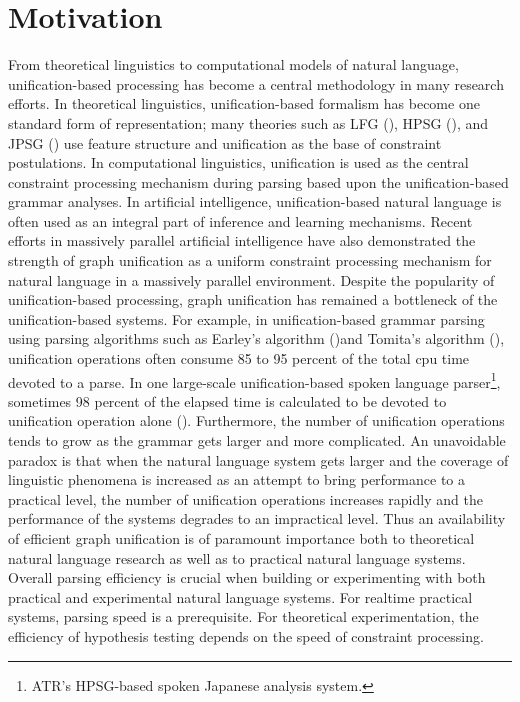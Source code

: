 
 



\maketitle



\section{Motivation}

 From theoretical linguistics to computational models of natural
language, unification-based processing has become a central
methodology in many research efforts. In theoretical linguistics,
unification-based formalism has become one standard form of
representation; many theories such as LFG (\cite{LFG}), HPSG
(\cite{HPSG}), and JPSG (\cite{JPSG}) use feature structure and
unification as the base of constraint postulations.  In computational
linguistics, unification is used as the central constraint processing
mechanism during parsing based upon the unification-based grammar
analyses. In artificial intelligence, unification-based natural
language is often used as an integral part of inference and learning
mechanisms. Recent efforts in massively parallel artificial
intelligence have also demonstrated the strength of graph unification
as a uniform constraint processing mechanism for natural language in a
massively parallel environment.  Despite the popularity of
unification-based processing, graph unification has remained a
bottleneck of the unification-based systems.  For example, in
unification-based grammar parsing using parsing algorithms such as
Earley's algorithm (\cite{Earley})and Tomita's algorithm
(\cite{Tomita}), unification operations often consume 85 to 95 percent
of the total cpu time devoted to a parse. In one large-scale
unification-based spoken language parser\footnote{ATR's HPSG-based
spoken Japanese analysis system.}, sometimes 98 percent of the elapsed
time is calculated to be devoted to unification operation alone
(\cite{Kogure-Lazy}).  Furthermore, the number of unification
operations tends to grow as the grammar gets larger and more
complicated.  An unavoidable paradox is that when the natural language
system gets larger and the coverage of linguistic phenomena is
increased as an attempt to bring performance to a practical level, the
number of unification operations increases rapidly and the performance
of the systems degrades to an impractical level. Thus an availability
of efficient graph unification is of paramount importance both to
theoretical natural language research as well as to practical natural
language systems.  Overall parsing efficiency is crucial when building
or experimenting with both practical and experimental natural language
systems. For realtime practical systems, parsing speed is a
prerequisite. For theoretical experimentation, the efficiency of
hypothesis testing depends on the speed of constraint processing.

